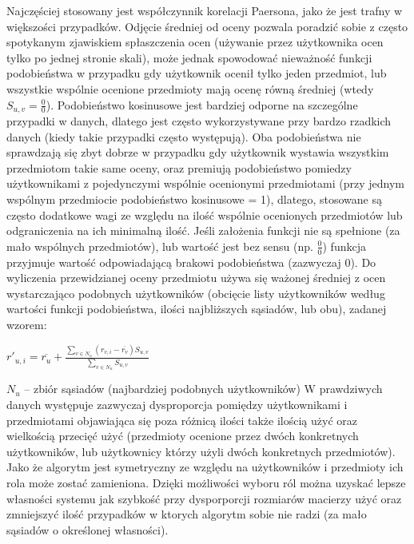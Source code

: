 \documentclass{pracamgr}
\begin{document}
    Najczęściej stosowany jest współczynnik korelacji Paersona, jako że jest trafny w większości przypadków.
    Odjęcie średniej od oceny pozwala poradzić sobie z często spotykanym zjawiskiem spłaszczenia ocen (używanie przez użytkownika ocen tylko po jednej stronie skali),
    może jednak spowodować nieważność funkcji podobieństwa w przypadku gdy użytkownik ocenił tylko jeden przedmiot,
    lub wszystkie wspólnie ocenione przedmioty mają ocenę równą średniej (wtedy $S_{u,v}=\frac{0}{0}$).
    Podobieństwo kosinusowe jest bardziej odporne na szczególne przypadki w danych,
    dlatego jest często wykorzystywane przy bardzo rzadkich danych (kiedy takie przypadki często występują).
    Oba podobieństwa nie sprawdzają się zbyt dobrze w przypadku gdy użytkownik wystawia wszystkim przedmiotom takie same oceny,
    oraz premiują podobieństwo pomiedzy użytkownikami z pojedynczymi wspólnie ocenionymi przedmiotami (przy jednym wspólnym przedmiocie podobieństwo kosinusowe = 1),
    dlatego, stosowane są często dodatkowe wagi ze względu na ilość wspólnie ocenionych przedmiotów lub odgraniczenia na ich minimalną ilość.
    Jeśli założenia funkcji nie są spełnione (za mało wspólnych przedmiotów), lub wartość jest bez sensu (np. $\frac{0}{0}$)
    funkcja przyjmuje wartość odpowiadającą brakowi podobieństwa (zazwyczaj 0).\newline\newline
    Do wyliczenia przewidzianej oceny przedmiotu używa się ważonej średniej z ocen wystarczająco podobnych użytkowników
    (obcięcie listy użytkowników według wartości funkcji podobieństwa, ilości najbliższych sąsiadów, lub obu), zadanej wzorem:\newline
    \begin{center}
     $r'_{u,i}=\overline{r_{u}}+\frac{\sum\limits_{v\in N_u}(r_{v,i}-\overline{r_v})S_{u,v}}{\sum\limits_{v\in N_u}S_{u,v}}$
    \end{center}
    {\scriptsize
     $N_u$ -- zbiór sąsiadów (najbardziej podobnych użytkowników)
    }\newline\newline
    W prawdziwych danych występuje zazwyczaj dysproporcja pomiędzy użytkownikami i przedmiotami objawiająca się poza różnicą ilości także
    ilością użyć oraz wielkością przecięć użyć (przedmioty ocenione przez dwóch konkretnych użytkowników,
    lub użytkownicy którzy użyli dwóch konkretnych przedmiotów).
    Jako że algorytm jest symetryczny ze względu na użytkowników i przedmioty ich rola może zostać zamieniona.    
    Dzięki możliwości wyboru ról można uzyskać lepsze własności systemu jak szybkość przy dysporporcji rozmiarów macierzy użyć oraz zmniejszyć
    ilość przypadków w ktorych algorytm sobie nie radzi (za mało sąsiadów o określonej własności).
    
\end{document}
